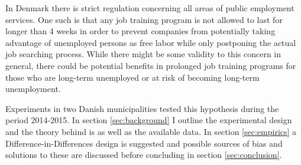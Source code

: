 In Denmark there is strict regulation concerning all areas of public employment services. One such is that any job training program is not allowed to last for longer than 4 weeks in order to prevent companies from potentially taking advantage of unemployed persons as free labor while only postponing the actual job searching process. While there might be some validity to this concern in general, there could be potential benefits in prolonged job training programs for those who are long-term unemployed or at risk of becoming long-term unemployment.

Experiments in two Danish municipalities tested this hypothesis during the period 2014-2015. In section \ref{sec:background} I outline the experimental design and the theory behind is as well as the available data. In section \ref{sec:empirics} a Difference-in-Differences design is suggested and possible sources of bias and solutions to these are discussed before concluding in section \ref{sec:conclusion}.

